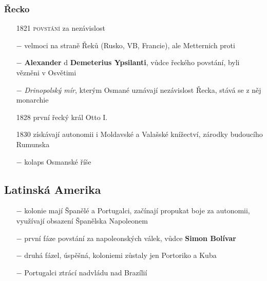 \documentclass{article}
\begin{document}
\subsubsection*{Řecko}
\begin{itemize}
    \vspace{-0.5em}
    \setlength\itemsep{0.15em}
    \item[1821] \textsc{povstání} za nezávislost
    \item[$-$] velmoci na straně Řeků (Rusko, VB, Francie), ale Metternich proti
    \item[$-$] \textbf{Alexander} d \textbf{Demeterius Ypsilanti}, vůdce řeckého povstání, byli vězněni v Osvětimi
    \item[$-$] \textit{Drinopolský mír}, kterým Osmané uznávají nezávislost Řecka, stává se z něj monarchie
    \item[1828] první řecký král Otto I.
    \item[1830] získávají autonomii i Moldavské a Valašské knížectví, zárodky budoucího Rumunska
    \item[$-$] kolaps Osmanské říše
\end{itemize}

\subsection*{Latinská Amerika}
\begin{itemize}
    \vspace{-0.5em}
    \setlength\itemsep{0.15em}
    \item[$-$] kolonie mají Španělé a Portugalci, začínají propukat boje za autonomii, využívají obsazení Španělska Napoleonem
    \item[$-$] první fáze povstání za napoleonských válek, vůdce \textbf{Simon Bolívar}
    \item[$-$] druhá fázel, úspěšná, koloniemi zůstaly jen Portoriko a Kuba
    \item[$-$] Portugalci ztrácí nadvládu nad Brazílií
\end{itemize}
\end{document}
